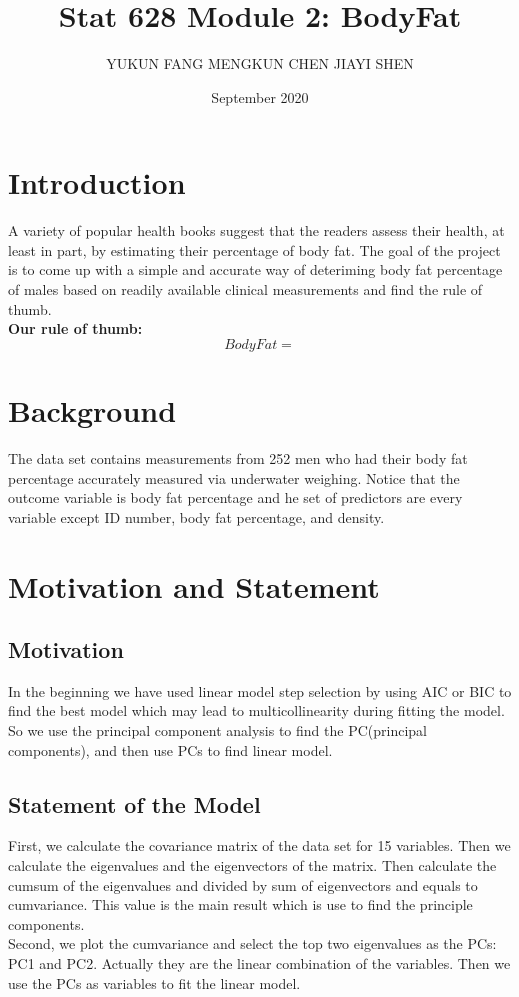 \documentclass[12pt]{article}
\title{\vspace{-3em}Stat 628 Module 2: BodyFat}
\author{YUKUN FANG \quad MENGKUN CHEN \quad JIAYI SHEN}
\date{September 2020}
\begin{document}
\sffamily
\maketitle
\section{\sffamily Introduction}
A variety of popular health books suggest that the readers assess their 
health, at least in part, by estimating their percentage of body fat.
The goal of the project is to come up with 
a simple and accurate way of deteriming body fat percentage of males
based on readily available clinical measurements and find the rule of thumb.\\
\textbf{Our rule of thumb:} $$ BodyFat = $$
\section{\sffamily Background}
The data set contains measurements from 252 men who had their body fat 
percentage accurately measured via underwater weighing. Notice that the 
outcome variable is body fat percentage and he set of predictors are 
every variable except ID number, body fat percentage, and density.
\section{\sffamily Motivation and Statement}
\subsection{\sffamily Motivation}
In the beginning we have used linear model step selection by using 
AIC or BIC to find the best model which may lead to multicollinearity during fitting the model.
So we use the principal component analysis to find the PC(principal components), and
then use PCs to find linear model.

\subsection{\sffamily Statement of the Model}
First, we calculate the covariance matrix of the data set for 15 variables.
Then we calculate the eigenvalues and the eigenvectors of the matrix.
Then calculate the cumsum of the eigenvalues and divided by sum of eigenvectors and equals to cumvariance. 
This value is the main result which is use to find the principle components.\\
\newline
Second, we plot the cumvariance and select the top two eigenvalues as the PCs: PC1 and PC2.
Actually they are the linear combination of the variables. Then we use the PCs
as variables to fit the linear model.
\end{document}
